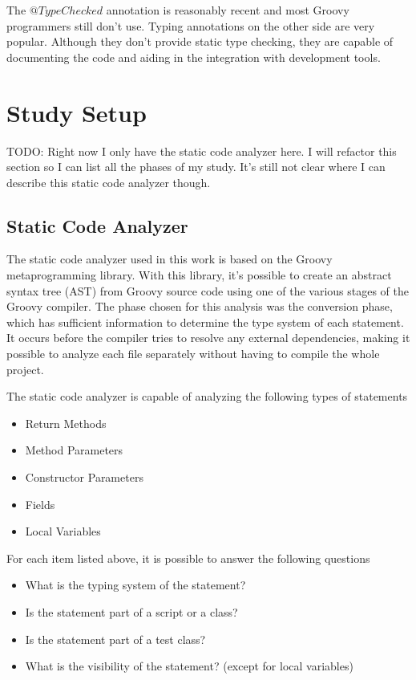 \documentclass[preprint]{sigplanconf}
\begin{document}
The $@TypeChecked$ annotation is reasonably recent and most Groovy programmers still don't use. 
Typing annotations on the other side are very popular.
Although they don't provide static type checking, they are capable of documenting the code and aiding in the integration with development tools.

\section{Study Setup\label{sec:Configura=0000E7=0000E3o-do-Estudo}}
TODO: Right now I only have the static code analyzer here. I will refactor this section so I can list all the phases of my study. It's still not clear where I can describe this static code analyzer though.

\subsection{Static Code Analyzer}
The static code analyzer used in this work is based on the Groovy metaprogramming library. 
With this library, it's possible to create an abstract syntax tree (AST) from Groovy source code using one of the various stages of the Groovy compiler.
The phase chosen for this analysis was the conversion phase, which has sufficient information to determine the type system of each statement.
It occurs before the compiler tries to resolve any external dependencies, making it possible to analyze each file separately without having to compile the whole project.

The static code analyzer is capable of analyzing the following types of statements
\begin{itemize}
	\item Return Methods
	\item Method Parameters
	\item Constructor Parameters
	\item Fields
	\item Local Variables
\end{itemize}

For each item listed above, it is possible to answer the following questions
\begin{itemize}
	\item What is the typing system of the statement?
	\item Is the statement part of a script or a class?
	\item Is the statement part of a test class?
	\item What is the visibility of the statement? (except for local variables)
\end{itemize}
\end{document}
